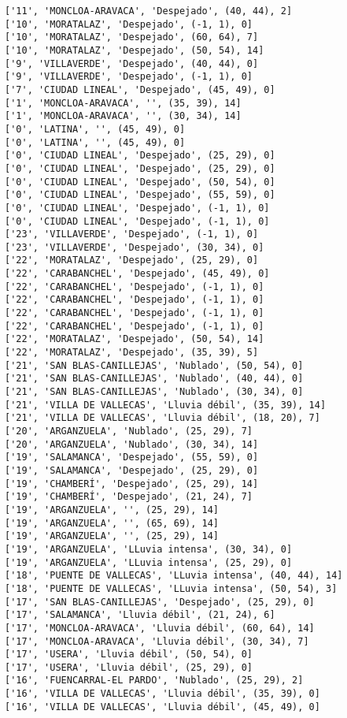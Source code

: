 \documentclass[11pt]{article}
\begin{document}
\begin{Verbatim}[commandchars=\\\{\}]
['11', 'MONCLOA-ARAVACA', 'Despejado', (40, 44), 2]
['10', 'MORATALAZ', 'Despejado', (-1, 1), 0]
['10', 'MORATALAZ', 'Despejado', (60, 64), 7]
['10', 'MORATALAZ', 'Despejado', (50, 54), 14]
['9', 'VILLAVERDE', 'Despejado', (40, 44), 0]
['9', 'VILLAVERDE', 'Despejado', (-1, 1), 0]
['7', 'CIUDAD LINEAL', 'Despejado', (45, 49), 0]
['1', 'MONCLOA-ARAVACA', '', (35, 39), 14]
['1', 'MONCLOA-ARAVACA', '', (30, 34), 14]
['0', 'LATINA', '', (45, 49), 0]
['0', 'LATINA', '', (45, 49), 0]
['0', 'CIUDAD LINEAL', 'Despejado', (25, 29), 0]
['0', 'CIUDAD LINEAL', 'Despejado', (25, 29), 0]
['0', 'CIUDAD LINEAL', 'Despejado', (50, 54), 0]
['0', 'CIUDAD LINEAL', 'Despejado', (55, 59), 0]
['0', 'CIUDAD LINEAL', 'Despejado', (-1, 1), 0]
['0', 'CIUDAD LINEAL', 'Despejado', (-1, 1), 0]
['23', 'VILLAVERDE', 'Despejado', (-1, 1), 0]
['23', 'VILLAVERDE', 'Despejado', (30, 34), 0]
['22', 'MORATALAZ', 'Despejado', (25, 29), 0]
['22', 'CARABANCHEL', 'Despejado', (45, 49), 0]
['22', 'CARABANCHEL', 'Despejado', (-1, 1), 0]
['22', 'CARABANCHEL', 'Despejado', (-1, 1), 0]
['22', 'CARABANCHEL', 'Despejado', (-1, 1), 0]
['22', 'CARABANCHEL', 'Despejado', (-1, 1), 0]
['22', 'MORATALAZ', 'Despejado', (50, 54), 14]
['22', 'MORATALAZ', 'Despejado', (35, 39), 5]
['21', 'SAN BLAS-CANILLEJAS', 'Nublado', (50, 54), 0]
['21', 'SAN BLAS-CANILLEJAS', 'Nublado', (40, 44), 0]
['21', 'SAN BLAS-CANILLEJAS', 'Nublado', (30, 34), 0]
['21', 'VILLA DE VALLECAS', 'Lluvia débil', (35, 39), 14]
['21', 'VILLA DE VALLECAS', 'Lluvia débil', (18, 20), 7]
['20', 'ARGANZUELA', 'Nublado', (25, 29), 7]
['20', 'ARGANZUELA', 'Nublado', (30, 34), 14]
['19', 'SALAMANCA', 'Despejado', (55, 59), 0]
['19', 'SALAMANCA', 'Despejado', (25, 29), 0]
['19', 'CHAMBERÍ', 'Despejado', (25, 29), 14]
['19', 'CHAMBERÍ', 'Despejado', (21, 24), 7]
['19', 'ARGANZUELA', '', (25, 29), 14]
['19', 'ARGANZUELA', '', (65, 69), 14]
['19', 'ARGANZUELA', '', (25, 29), 14]
['19', 'ARGANZUELA', 'LLuvia intensa', (30, 34), 0]
['19', 'ARGANZUELA', 'LLuvia intensa', (25, 29), 0]
['18', 'PUENTE DE VALLECAS', 'LLuvia intensa', (40, 44), 14]
['18', 'PUENTE DE VALLECAS', 'LLuvia intensa', (50, 54), 3]
['17', 'SAN BLAS-CANILLEJAS', 'Despejado', (25, 29), 0]
['17', 'SALAMANCA', 'Lluvia débil', (21, 24), 6]
['17', 'MONCLOA-ARAVACA', 'Lluvia débil', (60, 64), 14]
['17', 'MONCLOA-ARAVACA', 'Lluvia débil', (30, 34), 7]
['17', 'USERA', 'Lluvia débil', (50, 54), 0]
['17', 'USERA', 'Lluvia débil', (25, 29), 0]
['16', 'FUENCARRAL-EL PARDO', 'Nublado', (25, 29), 2]
['16', 'VILLA DE VALLECAS', 'Lluvia débil', (35, 39), 0]
['16', 'VILLA DE VALLECAS', 'Lluvia débil', (45, 49), 0]

\end{Verbatim}
\end{document}
